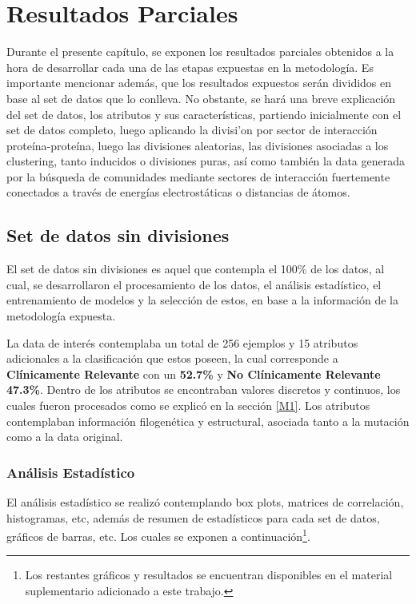 \chapter{Resultados Parciales}

Durante el presente cap\'itulo, se exponen los resultados parciales obtenidos a la hora de desarrollar cada una de las etapas expuestas en la metodolog\'ia.
Es importante mencionar adem\'as, que los resultados expuestos ser\'an divididos en base al set de datos que lo conlleva. No obstante, se har\'a una breve explicaci\'on del set de datos, los atributos y sus caracter\'isticas, partiendo inicialmente con el set de datos completo, luego aplicando la divisi'on por sector de interacci\'on prote\'ina-prote\'ina, luego las divisiones aleatorias, las divisiones asociadas a los clustering, tanto inducidos o divisiones puras, as\'i como tambi\'en la data generada por la b\'usqueda de comunidades mediante sectores de interacci\'on fuertemente conectados a trav\'es de energ\'ias electrost\'aticas o distancias de \'atomos.

\section{Set de datos sin divisiones}

El set de datos sin divisiones es aquel que contempla el 100\% de los datos, al cual, se desarrollaron el procesamiento de los datos, el an\'alisis estad\'istico, el entrenamiento de modelos y la selecci\'on de estos, en base a la informaci\'on de la metodolog\'ia expuesta.

La data de inter\'es contemplaba un total de 256 ejemplos y 15 atributos adicionales a la clasificaci\'on que estos poseen, la cual corresponde a \textbf{Cl\'inicamente Relevante} con un \textbf{52.7\%} y \textbf{No Cl\'inicamente Relevante} \textbf{47.3\%}. Dentro de los atributos se encontraban valores discretos y continuos, los cuales fueron procesados como se explic\'o en la secci\'on \ref{M1}. Los atributos contemplaban informaci\'on filogen\'etica y estructural, asociada tanto a la mutaci\'on como a la data original.

\subsection{An\'alisis Estad\'istico}

El an\'alisis estad\'istico se realiz\'o contemplando box plots, matrices de correlaci\'on, histogramas, etc, adem\'as de resumen de estad\'isticos para cada set de datos, gr\'aficos de barras, etc. Los cuales se exponen a continuaci\'on\footnote{Los restantes gr\'aficos y resultados se encuentran disponibles en el material suplementario adicionado a este trabajo.}.

